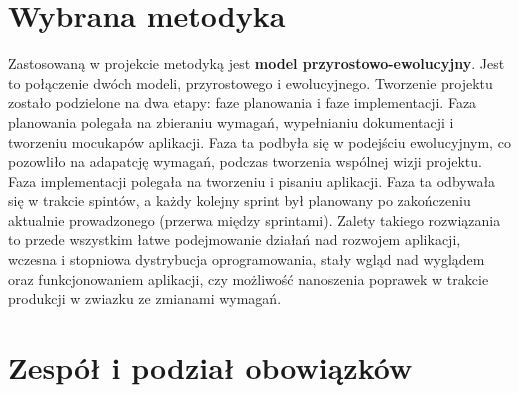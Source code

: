 \section{Wybrana metodyka}

\indent
Zastosowaną w projekcie metodyką jest \textbf{model przyrostowo-ewolucyjny}.
Jest to połączenie dwóch modeli, przyrostowego i ewolucyjnego. Tworzenie projektu zostało podzielone na dwa etapy:
faze planowania i faze implementacji. Faza planowania polegała na zbieraniu wymagań, wypełnianiu dokumentacji i
tworzeniu mocukapów aplikacji. Faza ta podbyła się w podejściu ewolucyjnym, co pozowliło na adapatcję wymagań,
podczas tworzenia wspólnej wizji projektu.\cite{roger2004} Faza implementacji polegała na tworzeniu i
pisaniu aplikacji. Faza ta odbywała się w trakcie spintów, a każdy kolejny sprint był planowany po
zakończeniu aktualnie prowadzonego (przerwa między sprintami).
Zalety takiego rozwiązania to przede wszystkim łatwe podejmowanie działań nad rozwojem aplikacji,
wczesna i stopniowa dystrybucja oprogramowania, stały wgląd nad wyglądem oraz funkcjonowaniem aplikacji, czy
możliwość nanoszenia poprawek w trakcie produkcji w zwiazku ze zmianami wymagań.

\section{Zespół i podział obowiązków}





